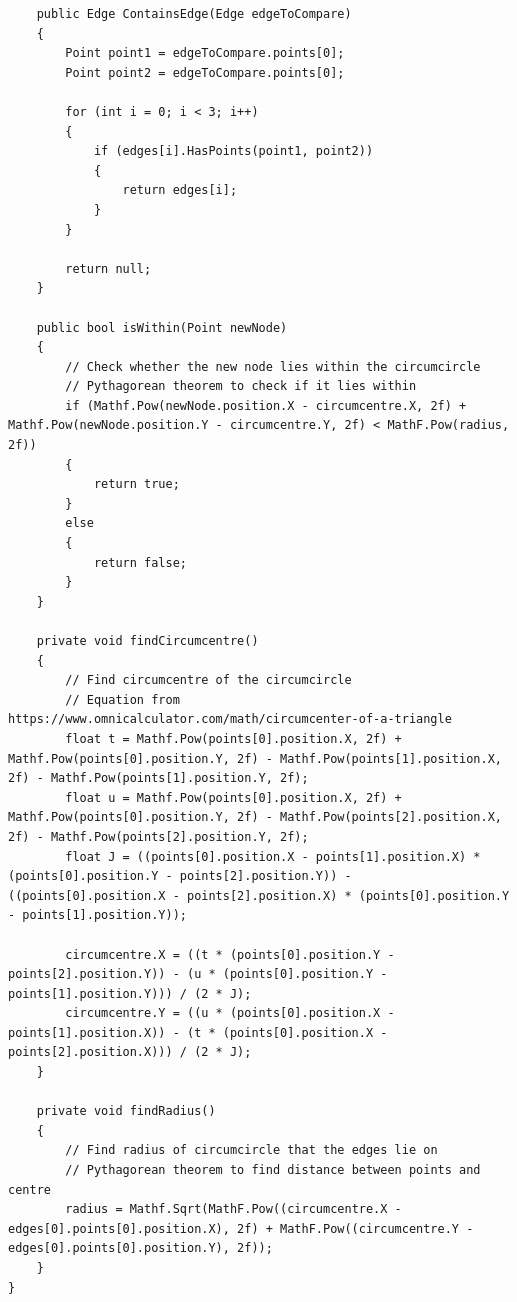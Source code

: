 \documentclass{article}
\begin{document}
\begin{lstlisting}
    public Edge ContainsEdge(Edge edgeToCompare)
    {
        Point point1 = edgeToCompare.points[0];
        Point point2 = edgeToCompare.points[0];

        for (int i = 0; i < 3; i++)
        {
            if (edges[i].HasPoints(point1, point2))
            {
                return edges[i];
            }
        }

        return null;
    }

    public bool isWithin(Point newNode)
    {
        // Check whether the new node lies within the circumcircle
        // Pythagorean theorem to check if it lies within
        if (Mathf.Pow(newNode.position.X - circumcentre.X, 2f) + Mathf.Pow(newNode.position.Y - circumcentre.Y, 2f) < MathF.Pow(radius, 2f))
        {
            return true;
        }
        else
        {
            return false;
        }
    }

    private void findCircumcentre()
    {
        // Find circumcentre of the circumcircle
        // Equation from https://www.omnicalculator.com/math/circumcenter-of-a-triangle
        float t = Mathf.Pow(points[0].position.X, 2f) + Mathf.Pow(points[0].position.Y, 2f) - Mathf.Pow(points[1].position.X, 2f) - Mathf.Pow(points[1].position.Y, 2f);
        float u = Mathf.Pow(points[0].position.X, 2f) + Mathf.Pow(points[0].position.Y, 2f) - Mathf.Pow(points[2].position.X, 2f) - Mathf.Pow(points[2].position.Y, 2f);
        float J = ((points[0].position.X - points[1].position.X) * (points[0].position.Y - points[2].position.Y)) - ((points[0].position.X - points[2].position.X) * (points[0].position.Y - points[1].position.Y));

        circumcentre.X = ((t * (points[0].position.Y - points[2].position.Y)) - (u * (points[0].position.Y - points[1].position.Y))) / (2 * J);
        circumcentre.Y = ((u * (points[0].position.X - points[1].position.X)) - (t * (points[0].position.X - points[2].position.X))) / (2 * J);
    }

    private void findRadius()
    {
        // Find radius of circumcircle that the edges lie on
        // Pythagorean theorem to find distance between points and centre 
        radius = Mathf.Sqrt(MathF.Pow((circumcentre.X - edges[0].points[0].position.X), 2f) + MathF.Pow((circumcentre.Y - edges[0].points[0].position.Y), 2f));
    }
}
\end{lstlisting}
\end{document}
